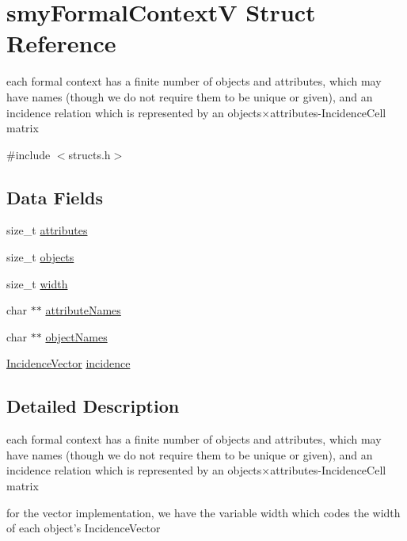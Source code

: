 \hypertarget{structsmyFormalContextV}{\section{smy\-Formal\-Context\-V \-Struct \-Reference}
\label{structsmyFormalContextV}
}


each formal context has a finite number of objects and attributes, which may have names (though we do not require them to be unique or given), and an incidence relation which is represented by an objects×attributes-\/\-Incidence\-Cell matrix  




{\ttfamily \#include $<$structs.\-h$>$}

\subsection*{\-Data \-Fields}
\begin{DoxyCompactItemize}
\item 
size\-\_\-t \hyperlink{structsmyFormalContextV_a94d6bf1233ed7e796e71595d53e85265}{attributes}
\item 
size\-\_\-t \hyperlink{structsmyFormalContextV_a6870c7afe6748004c41c81bd5e1c65d2}{objects}
\item 
size\-\_\-t \hyperlink{structsmyFormalContextV_ab4456c63ae1536d8a9afa9a42c30cd10}{width}
\item 
char $\ast$$\ast$ \hyperlink{structsmyFormalContextV_a10705bdd28894f84042e9c1be7f697c6}{attribute\-Names}
\item 
char $\ast$$\ast$ \hyperlink{structsmyFormalContextV_aac85d520aa4849d3dfbe4b1c85c17555}{object\-Names}
\item 
\hyperlink{fca_8h_aae617489ac88fff15979050721fe581f}{\-Incidence\-Vector} \hyperlink{structsmyFormalContextV_a1cc9b0c27ade0450dfe33b04c1f767b8}{incidence}
\end{DoxyCompactItemize}


\subsection{\-Detailed \-Description}
each formal context has a finite number of objects and attributes, which may have names (though we do not require them to be unique or given), and an incidence relation which is represented by an objects×attributes-\/\-Incidence\-Cell matrix 

for the vector implementation, we have the variable width which codes the width of each object's \-Incidence\-Vector 

